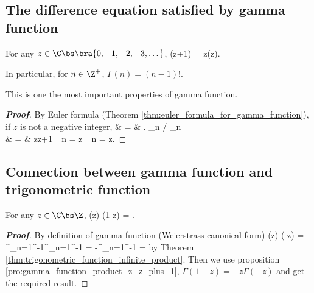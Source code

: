 \subsection{The difference equation satisfied by gamma function}

\begin{proposition}\label{pro:gamma_function_product_z_z_plus_1}
For any $z\in \C\bs \bra{0,-1,-2,-3,\dots}$,
\be
\Gamma(z+1) = z\Gamma(z).
\ee

In particular, for $n\in \Z^+$, $\Gamma(n) = (n-1)!$.
\end{proposition}

\begin{remark}
This is one the most important properties of gamma function.
\end{remark}

\begin{proof}[\bf Proof]
By Euler formula (Theorem \ref{thm:euler_formula_for_gamma_function}), if $z$ is not a negative integer,
\beast
{} & = & \left. \lim_{n\to \infty}  \right/  \lim_{n\to \infty} \\
& = & \frac z{z+1} \lim_{n\to \infty} = z \lim_{n\to \infty}  = z.
\eeast
\end{proof}
%
%

\subsection{Connection between gamma function and trigonometric function}

\begin{proposition}\label{pro:gamma_function_z_1_minus_z}
For any $z\in \C\bs \Z$,
\be
\Gamma(z) \Gamma(1-z) = .
\ee
\end{proposition}

\begin{proof}[\bf Proof]
By definition of gamma function (Weierstrass canonical form)
\be
\Gamma(z) \Gamma(-z) = -\prod^\infty_{n=1}^{-1}\prod^\infty_{n=1}^{-1} = -\prod^\infty_{n=1}^{-1} = 
\ee
by Theorem \ref{thm:trigonometric_function_infinite_product}. Then we use proposition \ref{pro:gamma_function_product_z_z_plus_1}, $\Gamma(1-z) = -z\Gamma(-z)$ and get the required result.
\end{proof}


